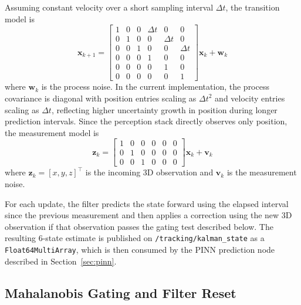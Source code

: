 \documentclass[11pt,letterpaper]{article}
\begin{document}
Assuming constant velocity over a short sampling interval $\Delta t$, the transition model is
\begin{equation}
\mathbf{x}_{k+1} =
\begin{bmatrix}
1 & 0 & 0 & \Delta t & 0 & 0 \\
0 & 1 & 0 & 0 & \Delta t & 0 \\
0 & 0 & 1 & 0 & 0 & \Delta t \\
0 & 0 & 0 & 1 & 0 & 0 \\
0 & 0 & 0 & 0 & 1 & 0 \\
0 & 0 & 0 & 0 & 0 & 1
\end{bmatrix}
\mathbf{x}_k + \mathbf{w}_k
\label{eq:kalman_transition}
\end{equation}
where $\mathbf{w}_k$ is the process noise. In the current implementation, the process covariance is diagonal with position entries scaling as $\Delta t^2$ and velocity entries scaling as $\Delta t$, reflecting higher uncertainty growth in position during longer prediction intervals. Since the perception stack directly observes only position, the measurement model is
\begin{equation}
\mathbf{z}_k =
\begin{bmatrix}
1 & 0 & 0 & 0 & 0 & 0 \\
0 & 1 & 0 & 0 & 0 & 0 \\
0 & 0 & 1 & 0 & 0 & 0
\end{bmatrix}
\mathbf{x}_k + \mathbf{v}_k
\label{eq:kalman_measurement}
\end{equation}
where $\mathbf{z}_k = [x,y,z]^\top$ is the incoming 3D observation and $\mathbf{v}_k$ is the measurement noise.

For each update, the filter predicts the state forward using the elapsed interval since the previous measurement and then applies a correction using the new 3D observation if that observation passes the gating test described below. The resulting 6-state estimate is published on \texttt{/tracking/kalman\_state} as a \texttt{Float64MultiArray}, which is then consumed by the PINN prediction node described in Section~\ref{sec:pinn}.

\subsection{Mahalanobis Gating and Filter Reset}
\label{sec:kalman_gating}
\end{document}
